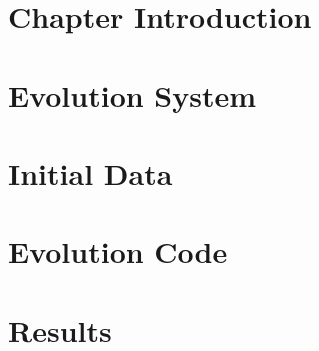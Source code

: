 \section{Chapter Introduction}
\label{ch:wave_scattering:sec:intro}


\section{Evolution System}
\label{ch:wave_scattering:sec:system}


\section{Initial Data}
\label{ch:wave_scattering:sec:id}


\section{Evolution Code}
\label{ch:wave_scattering:sec:code}


\section{Results}
\label{ch:wave_scattering:sec:results}
